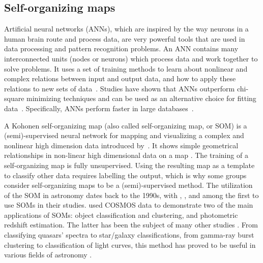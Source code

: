  \subsection{Self-organizing maps}
 \label{sec: som}
 
 Artificial neural networks (ANNs), which are inspired by the way neurons in a human brain route and process data, are very powerful tools that are used in data processing and pattern recognition problems.
An ANN contains many interconnected units (nodes or neurons) which process data and work together to solve problems.
It uses a set of training methods to learn about nonlinear and complex relations between input and output data, and how to apply these relations to new sets of data~\citep[e.g.][]{Hossein14,Hossein16a,Hossein16b,Ellison16a, Ellison16b}.
Studies have shown that ANNs outperform chi-square minimizing techniques and can be used as an alternative choice for fitting data~\citep[e.g.][]{Marquez91}.
Specifically, ANNs perform faster in large databases~\citep[][]{Gulati97}.

A Kohonen self-organizing map (also called self-organizing map, or SOM) is a (semi)-supervised neural network for mapping and visualizing a complex and nonlinear high dimension data introduced by~\citet{Kohonen82}.
It shows simple geometrical relationships in non-linear high dimensional data on a map \citep{Kohonen98}.
The training of a self-organizing map is fully unsupervised.
     Using the resulting map as a template to classify other data requires labelling the output, which is why some groups consider self-organizing maps to be a (semi)-supervised method.
The utilization of the SOM in astronomy dates back to the 1990s, with \citet[][]{Odewahn92}, \citet[][]{Hernandez94}, and \citet[][]{Murtagh95} among the first to use SOMs in their studies.
\citet{Geach12} used COSMOS data to demonstrate two of the main applications of SOMs: object classification and clustering, and photometric redshift estimation. The latter has been the subject of many other studies \citep[e.g.][]{Kind14a}.
From classifying quasars' spectra to star/galaxy classifications, from gamma-ray burst clustering to classification of light curves, this method has proved to be useful in various fields of astronomy \citep[e.g.][]{Maehoenen95, Miller96, Andreon00, Balastegui01, Rajaniemi02, Brett04, Scaringi09}.


